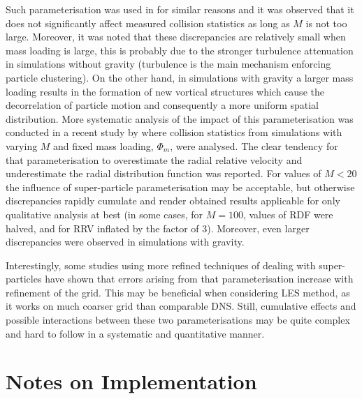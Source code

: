 \documentclass{pracamgren}
\begin{document}
Such parameterisation was used in \textcite{Rosa2020} for similar reasons and it was observed that it does not significantly affect measured collision statistics as long as $M$ is not too large.
Moreover, it was noted that these discrepancies are relatively small when mass loading is large, this is probably due to the stronger turbulence attenuation in simulations without gravity (turbulence is the main mechanism enforcing particle clustering).
On the other hand, in simulations with gravity a larger mass loading results in the formation of new vortical structures which cause the decorrelation of particle motion and consequently a more uniform spatial distribution.
More systematic analysis of the impact of this parameterisation was conducted in a recent study by \textcite{Rosa2022} where collision statistics from simulations with varying $M$ and fixed mass loading, $\Phi_m$, were analysed.
The clear tendency for that parameterisation to overestimate the radial relative velocity and underestimate the radial distribution function was reported.
For values of $M < 20$ the influence of super-particle parameterisation may be acceptable, but otherwise discrepancies rapidly cumulate and render obtained results applicable for only qualitative analysis at best (in some cases, for $M = 100$, values of RDF were halved, and for RRV inflated by the factor of $3$).
Moreover, even larger discrepancies were observed in simulations with gravity. 

Interestingly, some studies using more refined techniques of dealing with super-particles \parencite{Garg2009} have shown that errors arising from that parameterisation increase with refinement of the grid.
This may be beneficial when considering LES method, as it works on much coarser grid than comparable DNS.
Still, cumulative effects and possible interactions between these two parameterisations may be quite complex and hard to follow in a systematic and quantitative manner.



\section{Notes on Implementation}
\label{sc:ch1.impl}
\end{document}
